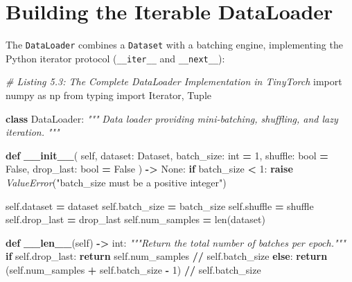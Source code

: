 \documentclass[
  letterpaper,
]{scrbook}
\newenvironment{Shaded}{\begin{snugshade}}{\end{snugshade}}
\newcommand{\BuiltInTok}[1]{#1}
\newcommand{\CommentTok}[1]{\textcolor[rgb]{0.56,0.35,0.01}{\textit{#1}}}
\newcommand{\ControlFlowTok}[1]{\textcolor[rgb]{0.13,0.29,0.53}{\textbf{#1}}}
\newcommand{\DecValTok}[1]{\textcolor[rgb]{0.00,0.00,0.81}{#1}}
\newcommand{\FunctionTok}[1]{\textcolor[rgb]{0.13,0.29,0.53}{\textbf{#1}}}
\newcommand{\ImportTok}[1]{#1}
\newcommand{\KeywordTok}[1]{\textcolor[rgb]{0.13,0.29,0.53}{\textbf{#1}}}
\newcommand{\NormalTok}[1]{#1}
\newcommand{\OperatorTok}[1]{\textcolor[rgb]{0.81,0.36,0.00}{\textbf{#1}}}
\newcommand{\PreprocessorTok}[1]{\textcolor[rgb]{0.56,0.35,0.01}{\textit{#1}}}
\newcommand{\StringTok}[1]{\textcolor[rgb]{0.31,0.60,0.02}{#1}}
\newcommand{\VariableTok}[1]{\textcolor[rgb]{0.00,0.00,0.00}{#1}}
\begin{document}
\section{Building the Iterable
DataLoader}\label{building-the-iterable-dataloader}

The \texttt{DataLoader} combines a \texttt{Dataset} with a batching
engine, implementing the Python iterator protocol (\texttt{\_\_iter\_\_}
and \texttt{\_\_next\_\_}):

\begin{Shaded}
\begin{Highlighting}[]
\CommentTok{\# Listing 5.3: The Complete DataLoader Implementation in TinyTorch}
\ImportTok{import}\NormalTok{ numpy }\ImportTok{as}\NormalTok{ np}
\ImportTok{from}\NormalTok{ typing }\ImportTok{import}\NormalTok{ Iterator, Tuple}

\KeywordTok{class}\NormalTok{ DataLoader:}
    \CommentTok{"""}
\CommentTok{    Data loader providing mini{-}batching, shuffling, and lazy iteration.}
\CommentTok{    """}

    \KeywordTok{def} \FunctionTok{\_\_init\_\_}\NormalTok{(}
        \VariableTok{self}\NormalTok{,}
\NormalTok{        dataset: Dataset,}
\NormalTok{        batch\_size: }\BuiltInTok{int} \OperatorTok{=} \DecValTok{1}\NormalTok{,}
\NormalTok{        shuffle: }\BuiltInTok{bool} \OperatorTok{=} \VariableTok{False}\NormalTok{,}
\NormalTok{        drop\_last: }\BuiltInTok{bool} \OperatorTok{=} \VariableTok{False}
\NormalTok{    ) }\OperatorTok{{-}\textgreater{}} \VariableTok{None}\NormalTok{:}
        \ControlFlowTok{if}\NormalTok{ batch\_size }\OperatorTok{\textless{}} \DecValTok{1}\NormalTok{:}
            \ControlFlowTok{raise} \PreprocessorTok{ValueError}\NormalTok{(}\StringTok{"batch\_size must be a positive integer"}\NormalTok{)}

        \VariableTok{self}\NormalTok{.dataset }\OperatorTok{=}\NormalTok{ dataset}
        \VariableTok{self}\NormalTok{.batch\_size }\OperatorTok{=}\NormalTok{ batch\_size}
        \VariableTok{self}\NormalTok{.shuffle }\OperatorTok{=}\NormalTok{ shuffle}
        \VariableTok{self}\NormalTok{.drop\_last }\OperatorTok{=}\NormalTok{ drop\_last}
        \VariableTok{self}\NormalTok{.num\_samples }\OperatorTok{=} \BuiltInTok{len}\NormalTok{(dataset)}

    \KeywordTok{def} \FunctionTok{\_\_len\_\_}\NormalTok{(}\VariableTok{self}\NormalTok{) }\OperatorTok{{-}\textgreater{}} \BuiltInTok{int}\NormalTok{:}
        \CommentTok{"""Return the total number of batches per epoch."""}
        \ControlFlowTok{if} \VariableTok{self}\NormalTok{.drop\_last:}
            \ControlFlowTok{return} \VariableTok{self}\NormalTok{.num\_samples }\OperatorTok{//} \VariableTok{self}\NormalTok{.batch\_size}
        \ControlFlowTok{else}\NormalTok{:}
            \ControlFlowTok{return}\NormalTok{ (}\VariableTok{self}\NormalTok{.num\_samples }\OperatorTok{+} \VariableTok{self}\NormalTok{.batch\_size }\OperatorTok{{-}} \DecValTok{1}\NormalTok{) }\OperatorTok{//} \VariableTok{self}\NormalTok{.batch\_size}


\end{Highlighting}
\end{Shaded}
\end{document}
